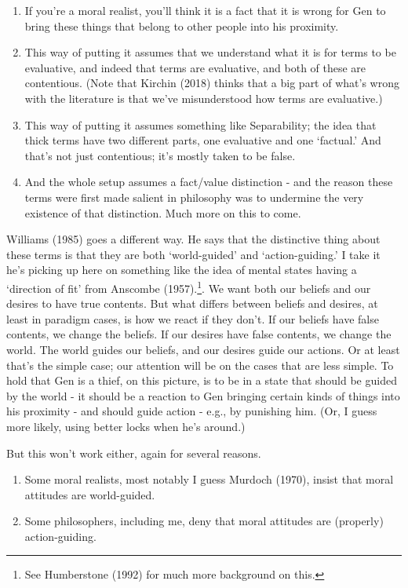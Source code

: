 \documentclass[
]{article}
\providecommand{\tightlist}{%
  \setlength{\itemsep}{0pt}\setlength{\parskip}{0pt}}
\begin{document}
\begin{enumerate}
\def\labelenumi{\arabic{enumi}.}
\tightlist
\item
  If you're a moral realist, you'll think it is a fact that it is wrong
  for Gen to bring these things that belong to other people into his
  proximity.
\item
  This way of putting it assumes that we understand what it is for terms
  to be evaluative, and indeed that terms are evaluative, and both of
  these are contentious. (Note that Kirchin (2018) thinks that a big
  part of what's wrong with the literature is that we've misunderstood
  how terms are evaluative.)
\item
  This way of putting it assumes something like Separability; the idea
  that thick terms have two different parts, one evaluative and one
  `factual.' And that's not just contentious; it's mostly taken to be
  false.
\item
  And the whole setup assumes a fact/value distinction - and the reason
  these terms were first made salient in philosophy was to undermine the
  very existence of that distinction. Much more on this to come.
\end{enumerate}

Williams (1985) goes a different way. He says that the distinctive thing
about these terms is that they are both `world-guided' and
`action-guiding.' I take it he's picking up here on something like the
idea of mental states having a `direction of fit' from Anscombe
(1957).\footnote{See Humberstone (1992) for much more background on
  this.}. We want both our beliefs and our desires to have true
contents. But what differs between beliefs and desires, at least in
paradigm cases, is how we react if they don't. If our beliefs have false
contents, we change the beliefs. If our desires have false contents, we
change the world. The world guides our beliefs, and our desires guide
our actions. Or at least that's the simple case; our attention will be
on the cases that are less simple. To hold that Gen is a thief, on this
picture, is to be in a state that should be guided by the world - it
should be a reaction to Gen bringing certain kinds of things into his
proximity - and should guide action - e.g., by punishing him. (Or, I
guess more likely, using better locks when he's around.)

But this won't work either, again for several reasons.

\begin{enumerate}
\def\labelenumi{\arabic{enumi}.}
\tightlist
\item
  Some moral realists, most notably I guess Murdoch (1970), insist that
  moral attitudes are world-guided.
\item
  Some philosophers, including me, deny that moral attitudes are
  (properly) action-guiding.
\end{enumerate}
\end{document}
